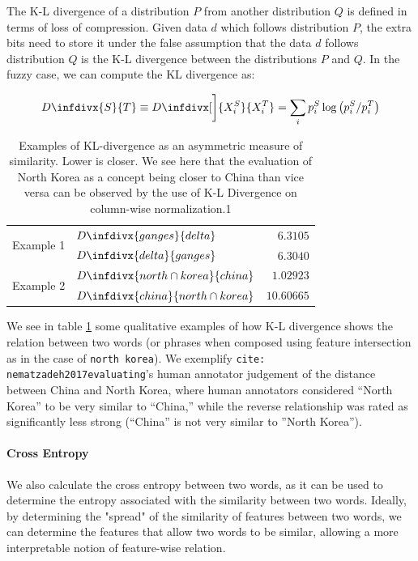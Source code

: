 \documentclass{book}
\newcommand{\infdiv}{D\infdivx}
\newcommand{\citet}[1]{\texttt{cite: #1}}
\begin{document}
The K-L divergence of a distribution $P$ from another distribution $Q$ is
defined in terms of loss of compression. Given data $d$ which follows
distribution $P$, the extra bits need to store it under the false assumption
that the data $d$ follows distribution $Q$ is the K-L divergence between the
distributions $P$ and $Q$. In the fuzzy case, we can compute the KL divergence
as:

{\footnotesize
\begin{equation*}
     \infdiv{S}{T} \equiv \infdiv[\bigg]{X^S_i}{X^T_i} =  \sum_i p^S_i \log \left( p^S_i / p^T_i \right) 
\end{equation*}
}

\begin{table}[]
    \centering
    {\small
    \begin{tabular}{clr}
        \multirow{2}{*}{Example 1} & $\infdiv{ganges}{delta}$ & $6.3105$  \\
                                   & $\infdiv{delta}{ganges}$ & $6.3040$  \\
        \multirow{2}{*}{Example 2} & $\infdiv{north \cap korea}{china}$ & $1.02923$ \\
                                   & $\infdiv{china}{north \cap korea}$ & $10.60665$
    \end{tabular}
    }
    \caption{Examples of KL-divergence as an asymmetric measure of similarity. Lower is closer. We see here that the evaluation of North Korea as a concept being closer to China than vice versa can be observed by the use of K-L Divergence on column-wise normalization.1}
    \label{tab: k-l divergence}
\end{table}

We see in table \ref{tab: k-l divergence} some qualitative examples of how K-L
divergence shows the relation between two words (or phrases when composed using
feature intersection as in the case of \texttt{north korea}). We exemplify
\citet{nematzadeh2017evaluating}'s human annotator judgement of the distance
between China and North Korea, where human annotators considered “North Korea”
to be very similar to “China,” while the reverse relationship was rated as
significantly less strong (“China” is not very similar to ”North Korea”).

\paragraph{Cross Entropy} We also calculate the cross entropy between two
words, as it can be used to determine the entropy associated with the
similarity between two words. Ideally, by determining the "spread" of the
similarity of features between two words, we can determine the features that
allow two words to be similar, allowing a more interpretable notion of
feature-wise relation. 
\end{document}
